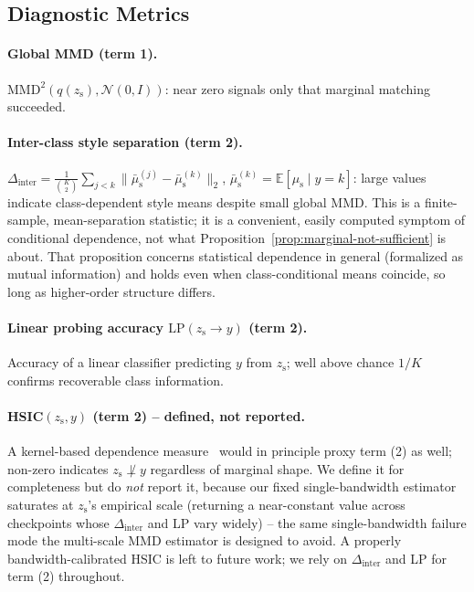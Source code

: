 \documentclass[10pt,letterpaper]{article}
\newcommand{\zs}{z_{\mathrm{s}}}
\newcommand{\mus}{\mu_{\mathrm{s}}}
\newcommand{\MMD}{\mathrm{MMD}}
\begin{document}
\subsection{Diagnostic Metrics}
\label{sec:diagnostics}

\paragraph{Global MMD (term 1).} $\MMD^2(q(\zs),\mathcal{N}(0,I))$: near
zero signals only that marginal matching succeeded.

\paragraph{Inter-class style separation (term 2).}
$\Delta_{\mathrm{inter}}=\frac{1}{\binom{K}{2}}\sum_{j<k}\|\bar\mus^{(j)}-\bar\mus^{(k)}\|_2$,
$\bar\mus^{(k)}=\mathbb{E}[\mus\mid y{=}k]$: large values indicate
class-dependent style means despite small global MMD. This is a
finite-sample, mean-separation statistic; it is a convenient, easily
computed symptom of conditional dependence, not what
Proposition~\ref{prop:marginal-not-sufficient} is about. That proposition
concerns statistical dependence in general (formalized as mutual
information) and holds even when class-conditional means coincide, so long
as higher-order structure differs.

\paragraph{Linear probing accuracy $\mathrm{LP}(\zs\to y)$ (term 2).}
Accuracy of a linear classifier predicting $y$ from $\zs$; well above
chance $1/K$ confirms recoverable class information.

\paragraph{HSIC$(\zs,y)$ (term 2) -- defined, not reported.} A kernel-based
dependence measure~\citep{gretton2005measuring} would in principle proxy
term (2) as well; non-zero indicates $\zs\not\perp y$ regardless of marginal
shape. We define it for completeness but do \emph{not} report it, because
our fixed single-bandwidth estimator saturates at $\zs$'s empirical scale
(returning a near-constant value across checkpoints whose $\Delta_{\mathrm{inter}}$
and LP vary widely) -- the same single-bandwidth failure mode the multi-scale
MMD estimator is designed to avoid. A properly bandwidth-calibrated HSIC is
left to future work; we rely on $\Delta_{\mathrm{inter}}$ and LP for term
(2) throughout.
\end{document}
